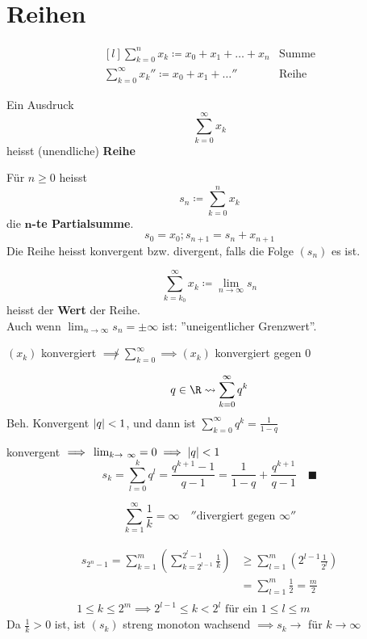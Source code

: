 \section{Reihen}
\[\begin{matrix*}[l]
	\sum_{k=0}^n x_k \coloneqq x_0 + x_1 + \dots + x_n	&\text{Summe}	\\
	\sum_{k=0}^\infty x_k ''\coloneqq x_0 + x_1 + \dots''	&\text{Reihe}	
\end{matrix*}\]

\begin{def*}[note = Reihe , index = Reihe]
	Ein Ausdruck
	\[ \sum_{k=0}^\infty x_k \]
	heisst (unendliche) \textbf{Reihe}
\end{def*}
\begin{def*}[note = Partialsumme , index = Partialsumme]
	Für $n \geq 0$ heisst
	\[ s_n \coloneqq \sum_{k=0}^n x_k \]
	die \textbf{$\mathbf{n}$-te Partialsumme}.
	\[ s_0 = x_0 ; s_{n+1} = s_n + x_{n+1} \]
	Die Reihe heisst konvergent bzw. divergent, falls die Folge $(s_n)$ es ist.
\end{def*}
\begin{def*}[note = Wert , index = Reihe!Wert]
	\[ \sum_{k=k_0}^\infty x_k \coloneqq \lim_{n \rightarrow \infty} s_n \]
	heisst der \textbf{Wert} der Reihe. \\
	Auch wenn $\lim_{n \rightarrow \infty} s_n = \pm \infty$ ist: ''uneigentlicher Grenzwert''.
\end{def*}
\begin{bem}
	$(x_k)$ konvergiert $\not\implies \sum_{k=0}^\infty \implies (x_k)$ konvergiert gegen $0$ \quad [Da $x_k = s_k - s_{k-1}$]
\end{bem}
\begin{bsp*}
	\[ q \in \R \rightsquigarrow \sum_{k=0}^\infty q^k \]
	Beh. Konvergent \gdw $\abs{q} < 1$, und dann ist $\sum_{k=0}^\infty q^k = \frac{1}{1-q}$ \\
	\begin{bew}
		konvergent $\implies \lim_{k \rightarrow \infty} = 0 \implies \abs{q} < 1$
		\[ s_k = \sum_{l=0}^k q^l = \frac{q^{k+1} - 1}{q-1} = \frac{1}{1-q} + \frac{q^{k+1}}{q-1} \quad \blacksquare \]
	\end{bew}
\end{bsp*}
\begin{bsp*}[note = Harmonische Reihe]
	\[ \sum_{k=1}^\infty \frac{1}{k} = \infty \quad ''\text{divergiert gegen } \infty '' \]
	\begin{bew}
		 \begin{gather*}
		 	\begin{split}
				s_{2^n-1} = \sum_{k=1}^m \left( \sum_{k=2^{l-1}}^{2^l - 1} \frac{1}{k} \right)	&\geq \sum_{l=1}^m \left( 2^{l-1} \frac{1}{2^l} \right) \\
																		&= \sum_{l=1}^m \frac{1}{2} = \frac{m}{2}
			\end{split} \\
			 1 \leq k \leq 2^m \implies 2^{l-1} \leq k < 2^l \text{ für ein } 1 \leq l \leq m
		\end{gather*}
		Da $\frac{1}{k} > 0$ ist, ist $(s_k)$ streng monoton wachsend $\implies s_k \rightarrow$ für $k \rightarrow \infty$ %
	\end{bew}
\end{bsp*}
